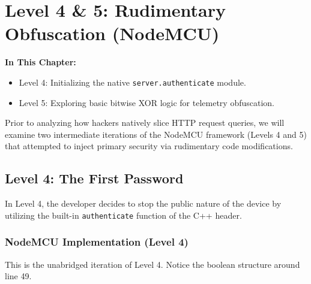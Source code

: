 \chapter{Level 4 \& 5: Rudimentary Obfuscation (NodeMCU)}

\textbf{In This Chapter:}
\begin{itemize}
    \item Level 4: Initializing the native \texttt{server.authenticate} module.
    \item Level 5: Exploring basic bitwise XOR logic for telemetry obfuscation.
\end{itemize}

Prior to analyzing how hackers natively slice HTTP request queries, we will examine two intermediate iterations of the NodeMCU framework (Levels 4 and 5) that attempted to inject primary security via rudimentary code modifications. 

\section{Level 4: The First Password}
In Level 4, the developer decides to stop the public nature of the device by utilizing the built-in \texttt{authenticate} function of the C++ header.

\subsection{NodeMCU Implementation (Level 4)}
This is the unabridged iteration of Level 4. Notice the boolean structure around line 49.

